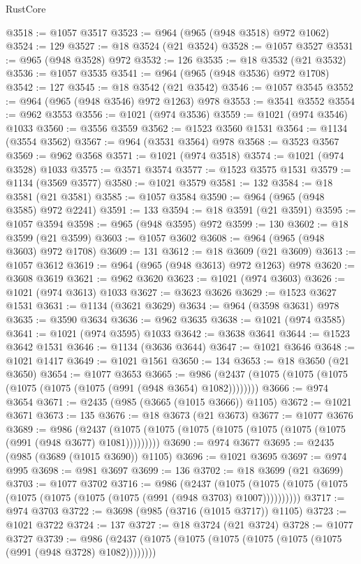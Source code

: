 \begin{lexlean}{RustCore}
\begin{coremodule}
@3518 := @1057 @3517
@3523 := @964 (@965 (@948 @3518) @972 @1062)
@3524 := 129
@3527 := @18 @3524 (@21 @3524)
@3528 := @1057 @3527
@3531 := @965 (@948 @3528) @972
@3532 := 126
@3535 := @18 @3532 (@21 @3532)
@3536 := @1057 @3535
@3541 := @964 (@965 (@948 @3536) @972 @1708)
@3542 := 127
@3545 := @18 @3542 (@21 @3542)
@3546 := @1057 @3545
@3552 := @964 (@965 (@948 @3546) @972 @1263) @978
@3553 := @3541 @3552
@3554 := @962 @3553
@3556 := @1021 (@974 @3536)
@3559 := @1021 (@974 @3546) @1033
@3560 := @3556 @3559
@3562 := @1523 @3560 @1531
@3564 := @1134 (@3554 @3562)
@3567 := @964 (@3531 @3564) @978
@3568 := @3523 @3567
@3569 := @962 @3568
@3571 := @1021 (@974 @3518)
@3574 := @1021 (@974 @3528) @1033
@3575 := @3571 @3574
@3577 := @1523 @3575 @1531
@3579 := @1134 (@3569 @3577)
@3580 := @1021 @3579
@3581 := 132
@3584 := @18 @3581 (@21 @3581)
@3585 := @1057 @3584
@3590 := @964 (@965 (@948 @3585) @972 @2241)
@3591 := 133
@3594 := @18 @3591 (@21 @3591)
@3595 := @1057 @3594
@3598 := @965 (@948 @3595) @972
@3599 := 130
@3602 := @18 @3599 (@21 @3599)
@3603 := @1057 @3602
@3608 := @964 (@965 (@948 @3603) @972 @1708)
@3609 := 131
@3612 := @18 @3609 (@21 @3609)
@3613 := @1057 @3612
@3619 := @964 (@965 (@948 @3613) @972 @1263) @978
@3620 := @3608 @3619
@3621 := @962 @3620
@3623 := @1021 (@974 @3603)
@3626 := @1021 (@974 @3613) @1033
@3627 := @3623 @3626
@3629 := @1523 @3627 @1531
@3631 := @1134 (@3621 @3629)
@3634 := @964 (@3598 @3631) @978
@3635 := @3590 @3634
@3636 := @962 @3635
@3638 := @1021 (@974 @3585)
@3641 := @1021 (@974 @3595) @1033
@3642 := @3638 @3641
@3644 := @1523 @3642 @1531
@3646 := @1134 (@3636 @3644)
@3647 := @1021 @3646
@3648 := @1021 @1417
@3649 := @1021 @1561
@3650 := 134
@3653 := @18 @3650 (@21 @3650)
@3654 := @1077 @3653
@3665 := @986 (@2437 (@1075 (@1075 (@1075 (@1075 (@1075 (@1075 (@991 (@948 @3654) @1082))))))))
@3666 := @974 @3654
@3671 := @2435 (@985 (@3665 (@1015 @3666)) @1105)
@3672 := @1021 @3671
@3673 := 135
@3676 := @18 @3673 (@21 @3673)
@3677 := @1077 @3676
@3689 := @986
    (@2437 (@1075 (@1075 (@1075 (@1075 (@1075 (@1075 (@1075 (@991 (@948 @3677) @1081)))))))))
@3690 := @974 @3677
@3695 := @2435 (@985 (@3689 (@1015 @3690)) @1105)
@3696 := @1021 @3695
@3697 := @974 @995
@3698 := @981 @3697
@3699 := 136
@3702 := @18 @3699 (@21 @3699)
@3703 := @1077 @3702
@3716 := @986
    (@2437
      (@1075 (@1075 (@1075 (@1075 (@1075 (@1075 (@1075 (@1075 (@991 (@948 @3703) @1007))))))))))
@3717 := @974 @3703
@3722 := @3698 (@985 (@3716 (@1015 @3717)) @1105)
@3723 := @1021 @3722
@3724 := 137
@3727 := @18 @3724 (@21 @3724)
@3728 := @1077 @3727
@3739 := @986 (@2437 (@1075 (@1075 (@1075 (@1075 (@1075 (@1075 (@991 (@948 @3728) @1082))))))))

\end{coremodule}
\end{lexlean}
